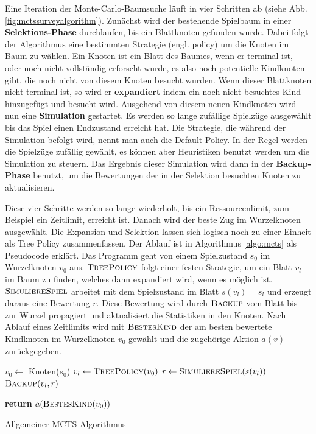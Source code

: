 Eine Iteration der Monte-Carlo-Baumsuche läuft in vier Schritten ab (siehe Abb. \ref{fig:mctssurveyalgorithm}). Zunächst wird der bestehende Spielbaum in einer \textbf{Selektions-Phase} durchlaufen, bis ein Blattknoten gefunden wurde. Dabei folgt der Algorithmus eine bestimmten Strategie (engl. policy) um die Knoten im Baum zu wählen. Ein Knoten ist ein Blatt des Baumes, wenn er terminal ist, oder noch nicht vollständig erforscht wurde, es also noch potentielle Kindknoten gibt, die noch nicht von diesem Knoten besucht wurden. Wenn dieser Blattknoten nicht terminal ist, so wird er \textbf{expandiert} indem ein noch nicht besuchtes Kind hinzugefügt und besucht wird. Ausgehend von diesem neuen Kindknoten wird nun eine \textbf{Simulation} gestartet. Es werden so lange zufällige Spielzüge ausgewählt bis das Spiel einen Endzustand erreicht hat. Die Strategie, die während der Simulation befolgt wird, nennt man auch die Default Policy. In der Regel werden die Spielzüge zufällig gewählt, es können aber Heuristiken benutzt werden um die Simulation zu steuern. Das Ergebnis dieser Simulation wird dann in der \textbf{Backup-Phase} benutzt, um die Bewertungen der in der Selektion besuchten Knoten zu aktualisieren.

Diese vier Schritte werden so lange wiederholt, bis ein Ressourcenlimit, zum Beispiel ein Zeitlimit, erreicht ist. Danach wird der beste Zug im Wurzelknoten ausgewählt. Die Expansion und Selektion lassen sich logisch noch zu einer Einheit als Tree Policy zusammenfassen.
Der Ablauf ist in Algorithmus \ref{algo:mcts} als Pseudocode erklärt. Das Programm geht von einem Spielzustand $s_0$ im Wurzelknoten $v_0$ aus. $\textsc{TreePolicy}$ folgt einer festen Strategie, um ein Blatt $v_l$ im Baum zu finden, welches dann expandiert wird, wenn es möglich ist. $\textsc{SimuliereSpiel}$ arbeitet mit dem Spielzustand im Blatt $s(v_l) = s_l$ und erzeugt daraus eine Bewertung $r$. Diese Bewertung wird durch $\textsc{Backup}$ vom Blatt bis zur Wurzel propagiert und aktualisiert die Statistiken in den Knoten. Nach Ablauf eines Zeitlimits wird mit $\textsc{BestesKind}$ der am besten bewertete Kindknoten im Wurzelknoten $v_0$ gewählt und die zugehörige Aktion $a(v)$ zurückgegeben.

\begin{algorithm}[H]
\begin{algorithmic}
	\State $v_0\gets$ Knoten($s_0$)
		\State $v_l\gets \Call{TreePolicy}{v_0}$
		\State $r\gets \Call{SimuliereSpiel}{s(v_l)}$
		\State $\Call{Backup}{v_l, r}$
	\EndWhile

\State \textbf{return} $a(\Call{BestesKind}{v_0})$
\EndFunction
\end{algorithmic}
\caption{Allgemeiner MCTS Algorithmus\footnotemark}
\label{algo:mcts}
\end{algorithm}

